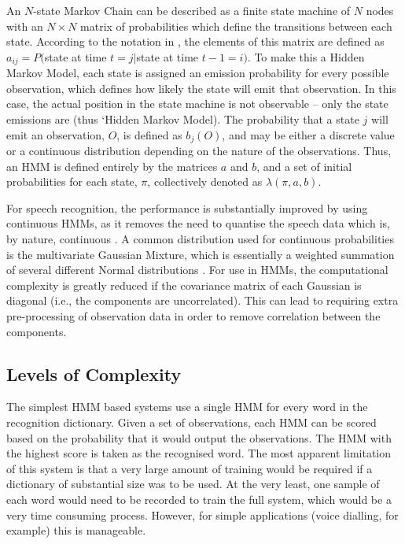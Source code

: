	An $N$-state Markov Chain can be described as a finite state machine of $N$ nodes with an $N{\times}N$ matrix of probabilities which define the transitions between each state.  According to the notation in \cite{rabiner1989tutorial}, the elements of this matrix are defined as $a_{ij} = P($state at time $t = j |$state at time $t-1 = i)$.  To make this a Hidden Markov Model, each state is assigned an emission probability for every possible observation, which defines how likely the state will emit that observation.  In this case, the actual position in the state machine is not observable -- only the state emissions are (thus `Hidden Markov Model).  The probability that a state $j$ will emit an observation, $O$, is defined as $b_j(O)$, and may be either a discrete value or a continuous distribution depending on the nature of the observations.  Thus, an HMM is defined entirely by the matrices $a$ and $b$, and a set of initial probabilities for each state, $\pi$, collectively denoted as $\lambda(\pi,a,b)$.

	For speech recognition, the performance is substantially improved by using continuous HMMs, as it removes the need to quantise the speech data which is, by nature, continuous \cite{matsui1992comparison}.  A common  distribution used for continuous probabilities is the multivariate Gaussian Mixture, which is essentially a weighted summation of several different Normal distributions \cite{bilmes2006hmms}.  For use in HMMs, the computational complexity is greatly reduced if the covariance matrix of each Gaussian is diagonal (i.e., the components are uncorrelated).  This can lead to requiring extra pre-processing of observation data in order to remove correlation between the components.

	\subsection{Levels of Complexity} %
	\label{sub:levels_of_complexity}
		The simplest HMM based systems use a single HMM for every word in the recognition dictionary.  Given a set of observations, each HMM can be scored based on the probability that it would output the observations.  The HMM with the highest score is taken as the recognised word.  The most apparent limitation of this system is that a very large amount of training would be required if a dictionary of substantial size was to be used.  At the very least, one sample of each word would need to be recorded to train the full system, which would be a very time consuming process.  However, for simple applications (voice dialling, for example) this is manageable.

